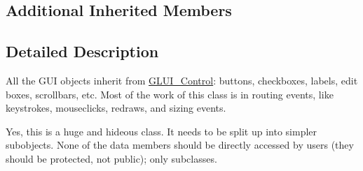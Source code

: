 \subsection*{Additional Inherited Members}


\subsection{Detailed Description}
All the G\-U\-I objects inherit from \hyperlink{classGLUI__Control}{G\-L\-U\-I\-\_\-\-Control}\-: buttons, checkboxes, labels, edit boxes, scrollbars, etc. Most of the work of this class is in routing events, like keystrokes, mouseclicks, redraws, and sizing events.

Yes, this is a huge and hideous class. It needs to be split up into simpler subobjects. None of the data members should be directly accessed by users (they should be protected, not public); only subclasses. 

